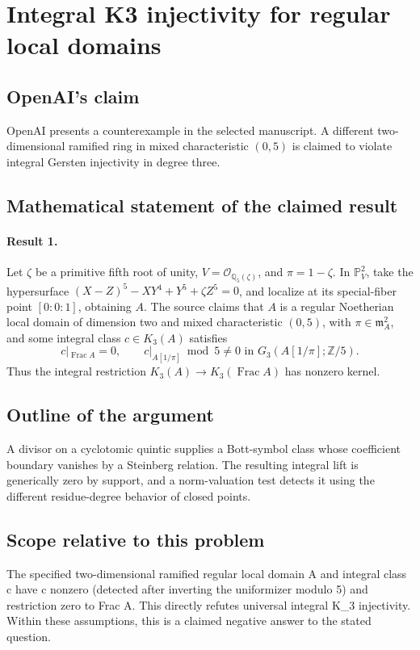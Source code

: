 \documentclass[11pt]{article}
\begin{document}
\section*{Integral K3 injectivity for regular local domains}

\subsection{OpenAI's claim}
OpenAI presents a counterexample in the selected manuscript. A different two-dimensional ramified ring in mixed characteristic $(0,5)$ is claimed to violate integral Gersten injectivity in degree three.

\subsection{Mathematical statement of the claimed result}
\paragraph{Result 1.} Let \(\zeta\) be a primitive fifth root of unity, \(V=\mathcal O_{\mathbb Q_5(\zeta)}\), and \(\pi=1-\zeta\). In \(\mathbb P^2_V\), take the hypersurface \((X-Z)^5-XY^4+Y^5+\zeta Z^5=0\), and localize at its special-fiber point \([0:0:1]\), obtaining \(A\). The source claims that \(A\) is a regular Noetherian local domain of dimension two and mixed characteristic \((0,5)\), with \(\pi\in\mathfrak m_A^2\), and some integral class \(c\in K_3(A)\) satisfies
\[
 c|_{\operatorname{Frac}A}=0,\qquad
 c|_{A[1/\pi]}\bmod5\ne0\text{ in }G_3(A[1/\pi];\mathbb Z/5).
\]
Thus the integral restriction \(K_3(A)\to K_3(\operatorname{Frac}A)\) has nonzero kernel.

\subsection{Outline of the argument}
A divisor on a cyclotomic quintic supplies a Bott-symbol class whose coefficient boundary vanishes by a Steinberg relation. The resulting integral lift is generically zero by support, and a norm-valuation test detects it using the different residue-degree behavior of closed points.

\subsection{Scope relative to this problem}
The specified two-dimensional ramified regular local domain A and integral class c have c nonzero (detected after inverting the uniformizer modulo 5) and restriction zero to Frac A. This directly refutes universal integral K\_3 injectivity. Within these assumptions, this is a claimed negative answer to the stated question.
\end{document}
